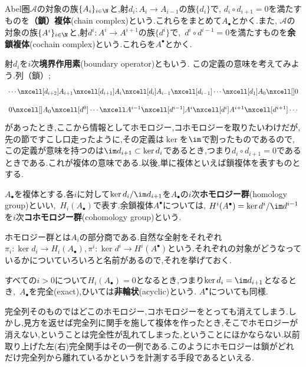 \begin{defi}[複体]
	Abel圏$\mathscr{A}$の対象の族$\{A_i\}_{i\in\N}$と,射$d_i:A_{i}\to A_{i-1}$の族$\{d_i\}$で, $d_{i}\circ d_{i+1}=0$を満たすものを\textbf{（鎖）複体}(chain complex)という.これらをまとめて$A_\bullet$とかく.また, $\mathscr{A}$の対象の族$\{A^i\}_{i\in\N}$と,射$d^i:A^i\to A^{i+1}$の族$\{d^i\}$で,~$d^i\circ d^{i-1}=0$を満たすものを\textbf{余鎖複体}(cochain complex)という.これらを$A^\bullet$とかく.
\end{defi}

射$d_i$を$i$次\textbf{境界作用素}(boundary operator)ともいう. この定義の意味を考えてみよう.列（鎖）;
\[\begin{tikzcd}
\cdots\nxcell[d_{i+2}]A_{i+1}\nxcell[d_{i+1}]A_i\nxcell[d_i]A_{i-1}\nxcell[d_{i-1}]\cdots\nxcell[d_1] A_0\nxcell[]0
\end{tikzcd}\]
\[\begin{tikzcd}
0\nxcell[]A_0\nxcell[d^0]\cdots\nxcell A^{i-1}\nxcell[d^{i-1}]A^i\nxcell[d^i]A^{i+1}\nxcell[d^{i+1}]\cdots
\end{tikzcd}\]
があったとき,ここから情報としてホモロジー,コホモロジーを取りたいわけだが,先の節ですこし口走ったように,その定義は$\ker$を$\im$で割ったものであるので,この定義が意味を持つのは$\im d_{i+1}\subset\ker d_i$であるとき,つまり$d_i\circ d_{i+1}=0$であるときである.これが複体の意味である.以後,単に複体といえば鎖複体を表すものとする.
\begin{defi}
	$A_\bullet$を複体とする.各$i$に対して$\ker d_i/\im d_{i+1}$を$A_\bullet$の$i$次\textbf{ホモロジー群}(homology group)といい,~$H_i(A_\bullet)$で表す.余鎖複体$A^\bullet$については, $H^i(A^\bullet)=\ker d^i/\im d^{i-1}$を$i$次\textbf{コホモロジー群}(cohomology group)という.
\end{defi}

ホモロジー群とは$A_i$の部分商である.自然な全射をそれぞれ$\pi_i:\ker d_i\to H_i(A_\bullet),\pi^i:\ker d^i\to H^i(A^\bullet)$という.それぞれの対象がどうなっているかについていろいろと名前があるので,それを挙げておく.
\begin{defi}[非輪状]
	すべての$i>0$について$H_i(A_\bullet)=0$となるとき,つまり$\ker d_i=\im d_{i+1}$となるとき,~$A_\bullet$を完全(exact),ひいては\textbf{非輪状}(acyclic)という. $A^\bullet$についても同様.
\end{defi}

完全列そのものではどこのホモロジー,コホモロジーをとっても消えてしまう.しかし,見方を返せば完全列に関手を施して複体を作ったとき,そこでホモロジーが消えない,ということは完全性が乱れてしまった,ということにほかならない.以前取り上げた左(右)完全関手はその一例である.このようにホモロジーは鎖がどれだけ完全列から離れているかというを計測する手段であるといえる.

